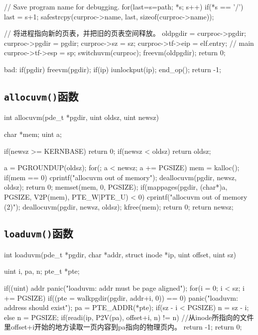 \documentclass{swfuthesism}
\begin{document}
\begin{ccode}
{  // Save program name for debugging.
  for(last=s=path; *s; s++)
    if(*s == '/')
      last = s+1;
  safestrcpy(curproc->name, last, sizeof(curproc->name));

  // 将进程指向新的页表，并把旧的页表空间释放。
  oldpgdir = curproc->pgdir;
  curproc->pgdir = pgdir;
  curproc->sz = sz;
  curproc->tf->eip = elf.entry;  // main
  curproc->tf->esp = sp;
  switchuvm(curproc);
  freevm(oldpgdir);
  return 0;

 bad:
  if(pgdir)
    freevm(pgdir);
  if(ip){
    iunlockput(ip);
    end_op();
  }
  return -1;
}
\end{ccode}

\subsection{\texttt{allocuvm()}函数}
\label{sec:allocuvm}

\begin{ccode}
int
allocuvm(pde_t *pgdir, uint oldsz, uint newsz)
{
  char *mem;
  uint a;

  if(newsz >= KERNBASE)
    return 0;
  if(newsz < oldsz)
    return oldsz;

  a = PGROUNDUP(oldsz);
  for(; a < newsz; a += PGSIZE){
    mem = kalloc();
    if(mem == 0){
      cprintf("allocuvm out of memory\n");
      deallocuvm(pgdir, newsz, oldsz);
      return 0;
    }
    memset(mem, 0, PGSIZE);
    if(mappages(pgdir, (char*)a, PGSIZE, V2P(mem), PTE_W|PTE_U) < 0){
      cprintf("allocuvm out of memory (2)\n");
      deallocuvm(pgdir, newsz, oldsz);
      kfree(mem);
      return 0;
    }
  }
  return newsz;
}
\end{ccode}

\subsection{\texttt{loaduvm()}函数}
\label{sec:loaduvm}

\begin{ccode}
int
loaduvm(pde_t *pgdir, char *addr, struct inode *ip, uint offset, uint sz)
{
  uint i, pa, n;
  pte_t *pte;

  if((uint) addr %
    panic("loaduvm: addr must be page aligned");
  for(i = 0; i < sz; i += PGSIZE){
    if((pte = walkpgdir(pgdir, addr+i, 0)) == 0)
      panic("loaduvm: address should exist");
    pa = PTE_ADDR(*pte);
    if(sz - i < PGSIZE)
      n = sz - i;
    else
      n = PGSIZE;
    if(readi(ip, P2V(pa), offset+i, n) != n) //从inode所指向的文件里offset+i开始的地方读取一页内容到pa指向的物理页内。
      return -1;
  }
  return 0;
}
\end{ccode}
\end{document}
